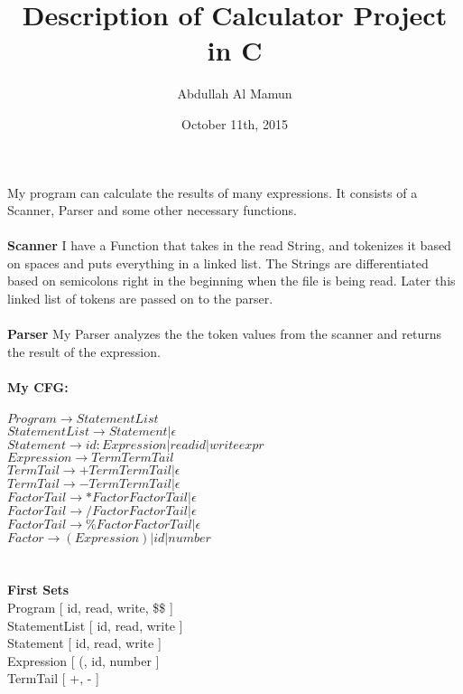 \documentclass[12pt]{article}
\title{\bf{Description of Calculator Project in C}}
\author{Abdullah Al Mamun}
\date{October 11th, 2015}
\begin{document}
\maketitle

\large{

My program can calculate the results of many expressions. It consists of a Scanner, Parser and some other necessary functions.
\\
\\
\textbf{Scanner}
I have a Function that takes in the read String, and tokenizes it based on spaces and puts everything in a linked list. The Strings are differentiated based on semicolons right in the beginning when the file is being read. Later this linked list of tokens are passed on to the parser.
\\
\\
\textbf{Parser}
My Parser analyzes the the token values from the scanner and returns the result of the expression.\\
\\
\textbf{My CFG:}\\
\\
$Program \rightarrow StatementList $ \\
$StatementList \rightarrow Statement | \epsilon $ \\
$Statement \rightarrow id: Expression | read id | write expr $ \\
$Expression \rightarrow Term TermTail $ \\
$TermTail \rightarrow + Term TermTail | \epsilon $ \\
$TermTail \rightarrow - Term TermTail| \epsilon $ \\
$FactorTail \rightarrow * Factor FactorTail | \epsilon $ \\
$FactorTail \rightarrow / Factor FactorTail | \epsilon $ \\
$FactorTail \rightarrow \% Factor FactorTail | \epsilon $ \\
$Factor \rightarrow ( Expression ) | id | number $\\
\\
\\
\textbf{First Sets}\\
Program [ id, read, write, \$\$ ] \\
StatementList [ id, read, write ] \\
Statement [ id, read, write ] \\
Expression [ (, id, number ] \\
TermTail [ +, - ] \\
}
\end{document}
